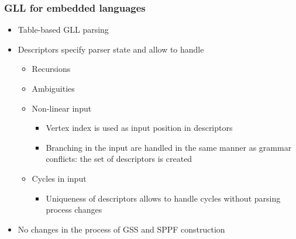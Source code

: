 \documentclass{beamer}
\begin{document}
\begin{frame}
  \transwipe[direction=90]
  \frametitle{GLL for embedded languages}  
  \begin{itemize}
    \item Table-based GLL parsing
    \item Descriptors specify parser state and allow to handle    
  \begin{itemize}
    \item Recursions
    \item Ambiguities
    \item Non-linear input
      \begin{itemize}
        \item Vertex index is used as input position in descriptors
        \item Branching in the input are handled in the same manner as grammar conflicts: the set of descriptors is created
      \end{itemize}
    \item Cycles in input
      \begin{itemize}
        \item Uniqueness of descriptors allows to handle cycles without parsing process changes
      \end{itemize}
    \end{itemize}
    \item  No changes in the process of GSS and SPPF construction
  \end{itemize}
\end{frame}
\end{document}

